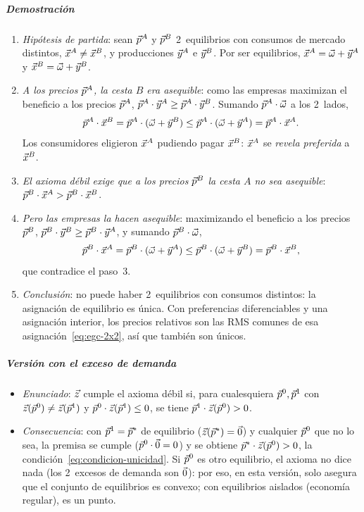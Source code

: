 \documentclass[11pt]{article}
\begin{document}
\subparagraph{Demostración}

\begin{enumerate}
\item \emph{Hipótesis de partida}: sean $\vec{p}^A$ y $\vec{p}^B$ 2~equilibrios con consumos de mercado distintos, $\vec{x}^A\neq\vec{x}^B$, y producciones $\vec{y}^A$ e $\vec{y}^B$. Por ser equilibrios, $\vec{x}^A=\vec{\omega}+\vec{y}^A$ y $\vec{x}^B=\vec{\omega}+\vec{y}^B$.
\item \emph{A los precios $\vec{p}^A$, la cesta $B$ era asequible}: como las empresas maximizan el beneficio a los precios $\vec{p}^A$, $\vec{p}^A\cdot\vec{y}^A\geq\vec{p}^A\cdot\vec{y}^B$. Sumando $\vec{p}^A\cdot\vec{\omega}$ a los 2~lados,
  \[
  \vec{p}^A\cdot\vec{x}^B=\vec{p}^A\cdot(\vec{\omega}+\vec{y}^B)\leq\vec{p}^A\cdot(\vec{\omega}+\vec{y}^A)=\vec{p}^A\cdot\vec{x}^A .
  \]
  Los consumidores eligieron $\vec{x}^A$ pudiendo pagar $\vec{x}^B$: $\vec{x}^A$ se \emph{revela preferida} a $\vec{x}^B$.
\item \emph{El axioma débil exige que a los precios $\vec{p}^B$ la cesta $A$ no sea asequible}: $\vec{p}^B\cdot\vec{x}^A>\vec{p}^B\cdot\vec{x}^B$.
\item \emph{Pero las empresas la hacen asequible}: maximizando el beneficio a los precios $\vec{p}^B$, $\vec{p}^B\cdot\vec{y}^B\geq\vec{p}^B\cdot\vec{y}^A$, y sumando $\vec{p}^B\cdot\vec{\omega}$,
  \[
  \vec{p}^B\cdot\vec{x}^A=\vec{p}^B\cdot(\vec{\omega}+\vec{y}^A)\leq\vec{p}^B\cdot(\vec{\omega}+\vec{y}^B)=\vec{p}^B\cdot\vec{x}^B ,
  \]
  que contradice el paso~3.
\item \emph{Conclusión}: no puede haber 2~equilibrios con consumos distintos: la asignación de equilibrio es única. Con preferencias diferenciables y una asignación interior, los precios relativos son las RMS comunes de esa asignación~\eqref{eq:egc-2x2}, así que también son únicos.\findemo
\end{enumerate}

\subparagraph{Versión con el exceso de demanda}

\begin{itemize}
\item \emph{Enunciado}: $\vec{z}$ cumple el axioma débil si, para cualesquiera $\vec{p}^0,\vec{p}^1$ con $\vec{z}(\vec{p}^0)\neq\vec{z}(\vec{p}^1)$ y $\vec{p}^0\cdot\vec{z}(\vec{p}^1)\leq 0$, se tiene $\vec{p}^1\cdot\vec{z}(\vec{p}^0)>0$\nocite{MasColellWhinstonGreen1995}.
\item \emph{Consecuencia}: con $\vec{p}^1=\vec{p}^*$ de equilibrio ($\vec{z}(\vec{p}^*)=\vec{0}$) y cualquier $\vec{p}^0$ que no lo sea, la premisa se cumple ($\vec{p}^0\cdot\vec{0}=0$) y se obtiene $\vec{p}^*\cdot\vec{z}(\vec{p}^0)>0$, la condición~\eqref{eq:condicion-unicidad}. Si $\vec{p}^0$ es otro equilibrio, el axioma no dice nada (los 2~excesos de demanda son $\vec{0}$): por eso, en esta versión, solo asegura que el conjunto de equilibrios es convexo; con equilibrios aislados (economía regular), es un punto.
\end{itemize}
\end{document}
